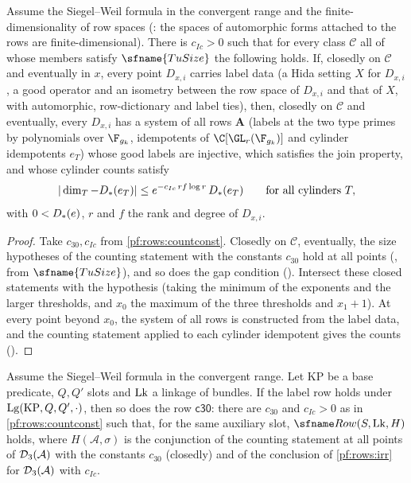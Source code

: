 \begin{proposition}\label{pf:rows:irr}
Assume the Siegel--Weil formula in the convergent range and the finite-dimensionality of row spaces
(: the spaces of automorphic forms attached to the rows are finite-dimensional).
There is $c_{Ic}>0$ such that for every class $\mathcal C$ all of whose members satisfy $\sfname{TuSize}$ the following holds.
If, closedly on $\mathcal C$ and eventually in $x$, every point $D_{x,i}$ carries label data (a Hida setting $X$ for
$D_{x,i}$, a good operator and an isometry between the row space of $D_{x,i}$ and that of $X$, with automorphic,
row-dictionary and label ties), then, closedly on $\mathcal C$ and eventually, every $D_{x,i}$ has a system of all rows $\mathbf A$
(labels at the two type primes by polynomials over $\F_{g_k}$, idempotents of $\C[\GL_r(\F_{g_k})]$ and cylinder
idempotents $e_T$) whose good labels are injective, which satisfies the join property, and whose cylinder counts satisfy
\[
|\dim_T-D_*(e_T)|\le e^{-c_{Ic}\,rf\log r}\,D_*(e_T)\qquad\text{for all cylinders }T,
\]
with $0<D_*(e)$, $r$ and $f$ the rank and degree of $D_{x,i}$.
\end{proposition}

\begin{proof}
Take $c_{30},c_{Ic}$ from \cref{pf:rows:countconst}. Closedly on $\mathcal C$, eventually, the size hypotheses of the
counting statement with the constants $c_{30}$ hold at all points (,
from $\sfname{TuSize}$), and so does the gap condition (). Intersect
these closed statements with the hypothesis (taking the minimum of the exponents and the larger thresholds, and
$x_0$ the maximum of the three thresholds and $x_1+1$). At every point beyond $x_0$, the system of all rows is
constructed from the label data, and the counting statement applied to each cylinder idempotent gives the counts
().
\end{proof}

\begin{proposition}\label{pf:rows:countrow}
Assume the Siegel--Weil formula in the convergent range. Let $\mathrm{KP}$ be a base predicate, $Q,Q'$ slots and $\mathrm{Lk}$
a linkage of bundles. If the label row holds under $\mathrm{Lg}(\mathrm{KP},Q,Q',\cdot)$, then so does the row
$\mathsf{c30}$: there are $c_{30}$ and $c_{Ic}>0$ as in \cref{pf:rows:countconst} such that, for the same auxiliary slot,
$\rowsRow(S,\rowsLk,H)$ holds, where $H(\mathcal A,\sigma)$ is the conjunction of the counting statement at all points of
$\mathcal{D}_3(\mathcal A)$ with the constants $c_{30}$ (closedly) and of the conclusion of \cref{pf:rows:irr} for
$\mathcal{D}_3(\mathcal A)$ with $c_{Ic}$.
\end{proposition}

